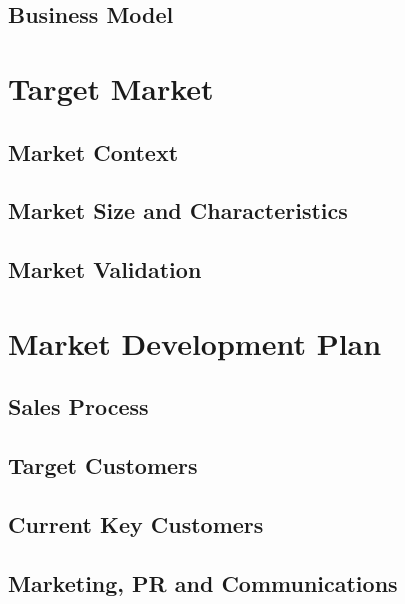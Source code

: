 \documentclass[11pt]{article}
\begin{document}
  \subsection{Business Model}
\section{Target Market}
  \subsection{Market Context}
  \subsection{Market Size and Characteristics}
  \subsection{Market Validation}
\section{Market Development Plan}
  \subsection{Sales Process}
  \subsection{Target Customers}
  \subsection{Current Key Customers}
  \subsection{Marketing, PR and Communications}
\end{document}
